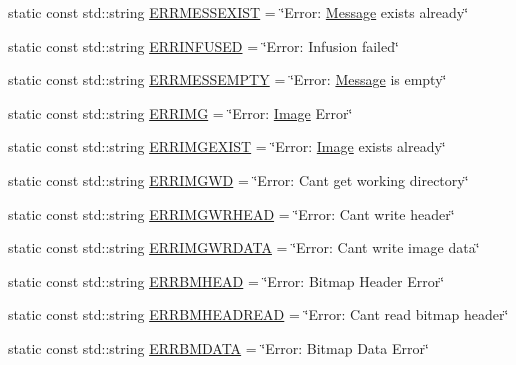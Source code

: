 \begin{DoxyCompactItemize}
static const std\+::string \mbox{\hyperlink{classErrorHandler_a8abcac399b5014dad5f8d728298489e3}{E\+R\+R\+M\+E\+S\+S\+E\+X\+I\+ST}} = \char`\"{}Error\+: \mbox{\hyperlink{classMessage}{Message}} exists already\char`\"{}
\item 
static const std\+::string \mbox{\hyperlink{classErrorHandler_a8ee302ac7c97c484eb90c8e08fad3749}{E\+R\+R\+I\+N\+F\+U\+S\+ED}} = \char`\"{}Error\+: Infusion failed\char`\"{}
\item 
static const std\+::string \mbox{\hyperlink{classErrorHandler_a28d8ef2ee23112d4895dd60788c1b152}{E\+R\+R\+M\+E\+S\+S\+E\+M\+P\+TY}} = \char`\"{}Error\+: \mbox{\hyperlink{classMessage}{Message}} is empty\char`\"{}
\item 
static const std\+::string \mbox{\hyperlink{classErrorHandler_a0e6e270374c8c2d2bf1cf3525e2b185b}{E\+R\+R\+I\+MG}} = \char`\"{}Error\+: \mbox{\hyperlink{classImage}{Image}} Error\char`\"{}
\item 
static const std\+::string \mbox{\hyperlink{classErrorHandler_a32d9d3b8749844fa07ce891edea63286}{E\+R\+R\+I\+M\+G\+E\+X\+I\+ST}} = \char`\"{}Error\+: \mbox{\hyperlink{classImage}{Image}} exists already\char`\"{}
\item 
static const std\+::string \mbox{\hyperlink{classErrorHandler_adf275e9080935450d46748424c788efa}{E\+R\+R\+I\+M\+G\+WD}} = \char`\"{}Error\+: Can\textquotesingle{}t get working directory\char`\"{}
\item 
static const std\+::string \mbox{\hyperlink{classErrorHandler_aaacdfc33d32a1f97a8a2704512fa4436}{E\+R\+R\+I\+M\+G\+W\+R\+H\+E\+AD}} = \char`\"{}Error\+: Can\textquotesingle{}t write header\char`\"{}
\item 
static const std\+::string \mbox{\hyperlink{classErrorHandler_afc2c1377f8cee14dac495c98323b02f1}{E\+R\+R\+I\+M\+G\+W\+R\+D\+A\+TA}} = \char`\"{}Error\+: Can\textquotesingle{}t write image data\char`\"{}
\item 
static const std\+::string \mbox{\hyperlink{classErrorHandler_ace09849c636b0d6692e5437dfd3fb099}{E\+R\+R\+B\+M\+H\+E\+AD}} = \char`\"{}Error\+: Bitmap Header Error\char`\"{}
\item 
static const std\+::string \mbox{\hyperlink{classErrorHandler_ad44dda4b409046f04853a02d460be932}{E\+R\+R\+B\+M\+H\+E\+A\+D\+R\+E\+AD}} = \char`\"{}Error\+: Can\textquotesingle{}t read bitmap header\char`\"{}
\item 
static const std\+::string \mbox{\hyperlink{classErrorHandler_a8aa9a03085699f122048543d17a74796}{E\+R\+R\+B\+M\+D\+A\+TA}} = \char`\"{}Error\+: Bitmap Data Error\char`\"{}

\end{DoxyCompactItemize}
